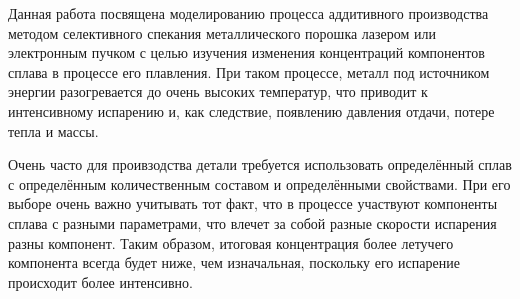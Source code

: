 Данная работа посвящена моделированию процесса аддитивного производства методом селективного спекания металлического порошка лазером или электронным пучком с целью изучения изменения концентраций компонентов сплава в процессе его плавления. При таком процессе, металл под источником энергии разогревается до очень высоких температур, что приводит к интенсивному испарению и, как следствие, появлению давления отдачи, потере тепла и массы. 

Очень часто для проивзодства детали требуется использовать определённый сплав с определённым количественным составом и определёнными свойствами. При его выборе очень важно учитывать тот факт, что в процессе участвуют компоненты сплава с разными параметрами, что влечет за собой разные скорости испарения разны компонент. Таким образом, итоговая концентрация более летучего компонента всегда будет ниже, чем изначальная, поскольку его испарение происходит более интенсивно.

\clearpage